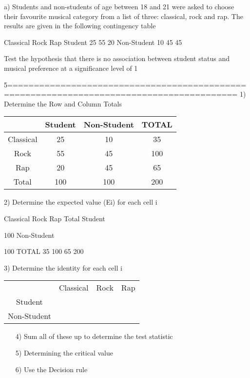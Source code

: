 \documentclass[]{report}
\begin{document}
a) Students and non-students of age between 18 and 21 were asked to choose their favourite musical category from a list of three: classical, rock and rap. The results are given in the following contingency table


Classical
Rock
Rap
Student
25
55
20
Non-Student
10
45
45

Test the hypothesis that there is no association between student status and musical preference at a significance level of 1%

5=========================================================================================%
1) Determine the Row and Column Totals
\begin{center}
	\begin{tabular}{cccc}
	&	Student	&	Non-Student	&	TOTAL	\\ \hline
	Classical	&	25	&	10	&	35	\\ \hline
	Rock	&	55	&	45	&	100	\\ \hline
	Rap	&	20	&	45	&	65	\\ \hline
	Total	&	100	&	100	&	200	\\ \hline
\end{tabular}
\end{center}


2) Determine the expected value (Ei)  for each cell i

Classical
Rock
Rap
Total
Student



100
Non-Student



100
TOTAL
35
100
65
200



3) Determine the identity  for each cell i

\begin{center}
\begin{tabular}{cccc}
	& Classical & Rock& Rap \\
	Student    &		   &     &     \\
	Non-Student&           &     &     \\
\end{tabular}
\end{center}



\begin{itemize}
	\item[4)] Sum all of these up to determine the test statistic
	
	\item[5)] Determining the critical value
	
\item[6)] Use the Decision rule
\end{itemize}
\end{document}

